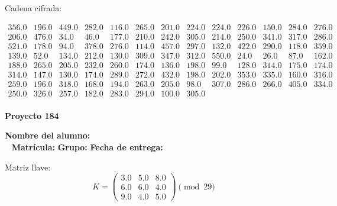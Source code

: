 \documentclass[12pt]{article}
\begin{document}
Cadena cifrada:
\begin{center}
$\begin{array}{lllllllllllll}
356.0 & 196.0 & 449.0 & 282.0 & 116.0 & 265.0 & 201.0 & 224.0 & 224.0 & 226.0 & 150.0 & 284.0 & 276.0\\
206.0 & 476.0 & 34.0 & 46.0 & 177.0 & 210.0 & 242.0 & 305.0 & 214.0 & 250.0 & 341.0 & 317.0 & 286.0\\
521.0 & 178.0 & 94.0 & 378.0 & 276.0 & 114.0 & 457.0 & 297.0 & 132.0 & 422.0 & 290.0 & 118.0 & 359.0\\
139.0 & 52.0 & 134.0 & 212.0 & 130.0 & 309.0 & 347.0 & 312.0 & 550.0 & 24.0 & 26.0 & 87.0 & 162.0\\
188.0 & 265.0 & 205.0 & 232.0 & 260.0 & 174.0 & 136.0 & 198.0 & 99.0 & 128.0 & 314.0 & 175.0 & 174.0\\
314.0 & 147.0 & 130.0 & 174.0 & 289.0 & 272.0 & 432.0 & 198.0 & 202.0 & 353.0 & 335.0 & 160.0 & 316.0\\
259.0 & 196.0 & 318.0 & 168.0 & 194.0 & 263.0 & 205.0 & 98.0 & 307.0 & 286.0 & 266.0 & 405.0 & 334.0\\
250.0 & 326.0 & 257.0 & 182.0 & 283.0 & 294.0 & 100.0 & 305.0\\
\end{array}$
\end{center}

\newpage


\textbf{Proyecto 184}

\textbf{Nombre del alumno:} \underline{\hspace{13cm}}\\\
\vspace{1cm}
\textbf{Matrícula:} \underline{\hspace{4cm}} \hspace{1cm}
\textbf{Grupo:} \underline{\hspace{2cm}}
\textbf{Fecha de entrega:} \underline{\hspace{2cm}}

\medskip

Matriz llave:
\[
K = \begin{pmatrix}
3.0 & 5.0 & 8.0\\
6.0 & 6.0 & 4.0\\
9.0 & 4.0 & 5.0
\end{pmatrix} \pmod{29}
\]
\end{document}
